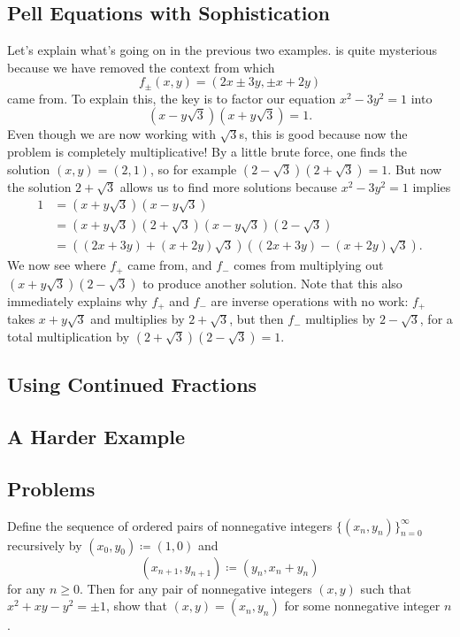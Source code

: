 \documentclass[../notes.tex]{subfiles}
\begin{document}
\subsection{Pell Equations with Sophistication} \label{subsec:intro-real-quad-for-pell}
Let's explain what's going on in the previous two examples.  is quite mysterious because we have removed the context from which
\[f_{\pm}(x,y)=(2x\pm3y,\pm x+2y)\]
came from. To explain this, the key is to factor our equation $x^2-3y^2=1$ into
\[\left(x-y\sqrt3\right)\left(x+y\sqrt3\right)=1.\]
Even though we are now working with $\sqrt3$s, this is good because now the problem is completely multiplicative! By a little brute force, one finds the solution $(x,y)=(2,1)$, so for example $\left(2-\sqrt3\right)\left(2+\sqrt3\right)=1$. But now the solution $2+\sqrt3$ allows us to find more solutions because $x^2-3y^2=1$ implies
\begin{align*}
	1 &= \left(x+y\sqrt3\right)\left(x-y\sqrt3\right) \\
	&= \left(x+y\sqrt3\right)\left(2+\sqrt3\right)\left(x-y\sqrt3\right)\left(2-\sqrt3\right) \\
	&= \left((2x+3y)+(x+2y)\sqrt3\right)\left((2x+3y)-(x+2y)\sqrt3\right).
\end{align*}
We now see where $f_+$ came from, and $f_-$ comes from multiplying out $\left(x+y\sqrt3\right)\left(2-\sqrt3\right)$ to produce another solution. Note that this also immediately explains why $f_+$ and $f_-$ are inverse operations with no work: $f_+$ takes $x+y\sqrt3$ and multiplies by $2+\sqrt3$, but then $f_-$ multiplies by $2-\sqrt3$, for a total multiplication by $\left(2+\sqrt3\right)\left(2-\sqrt3\right)=1$.

\subsection{Using Continued Fractions}

\subsection{A Harder Example}

\subsection{Problems}
\begin{prob}[4 points] \label{prob:pell-5-norm}
	Define the sequence of ordered pairs of nonnegative integers $\{(x_n,y_n)\}_{n=0}^\infty$ recursively by $(x_0,y_0)\coloneqq(1,0)$ and
	\[(x_{n+1},y_{n+1})\coloneqq(y_n,x_n+y_n)\]
	for any $n\ge0$. Then for any pair of nonnegative integers $(x,y)$ such that $x^2+xy-y^2=\pm1$, show that $(x,y)=(x_n,y_n)$ for some nonnegative integer $n$.
\end{prob}
\end{document}
